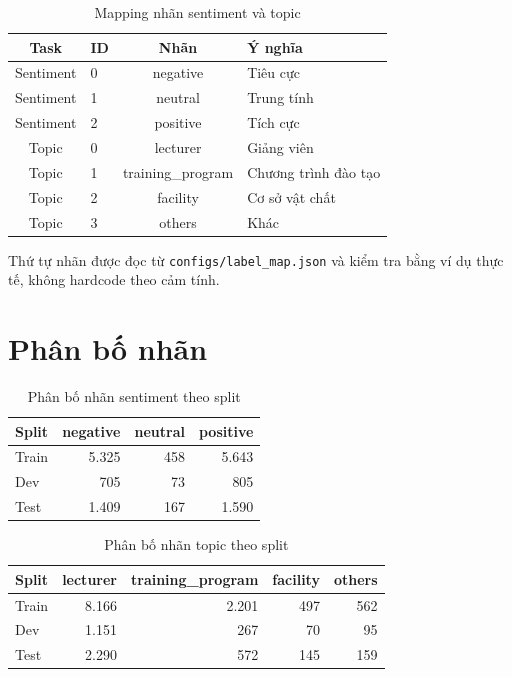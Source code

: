 \documentclass[12pt,a4paper]{report}
\begin{document}
\begin{table}[H]
\centering
\caption{Mapping nhãn sentiment và topic}
\begin{tabular}{@{}clcl@{}}
\toprule
\textbf{Task} & \textbf{ID} & \textbf{Nhãn} & \textbf{Ý nghĩa} \\
\midrule
Sentiment & 0 & negative & Tiêu cực \\
Sentiment & 1 & neutral & Trung tính \\
Sentiment & 2 & positive & Tích cực \\
\midrule
Topic & 0 & lecturer & Giảng viên \\
Topic & 1 & training\_program & Chương trình đào tạo \\
Topic & 2 & facility & Cơ sở vật chất \\
Topic & 3 & others & Khác \\
\bottomrule
\end{tabular}
\end{table}

Thứ tự nhãn được đọc từ \texttt{configs/label\_map.json} và kiểm tra bằng ví dụ thực tế, không hardcode theo cảm tính.

\section{Phân bố nhãn}

\begin{table}[H]
\centering
\caption{Phân bố nhãn sentiment theo split}
\begin{tabular}{@{}lrrr@{}}
\toprule
\textbf{Split} & \textbf{negative} & \textbf{neutral} & \textbf{positive} \\
\midrule
Train & 5.325 & 458 & 5.643 \\
Dev & 705 & 73 & 805 \\
Test & 1.409 & 167 & 1.590 \\
\bottomrule
\end{tabular}
\end{table}

\begin{table}[H]
\centering
\caption{Phân bố nhãn topic theo split}
\begin{tabular}{@{}lrrrr@{}}
\toprule
\textbf{Split} & \textbf{lecturer} & \textbf{training\_program} & \textbf{facility} & \textbf{others} \\
\midrule
Train & 8.166 & 2.201 & 497 & 562 \\
Dev & 1.151 & 267 & 70 & 95 \\
Test & 2.290 & 572 & 145 & 159 \\
\bottomrule
\end{tabular}
\end{table}
\end{document}
